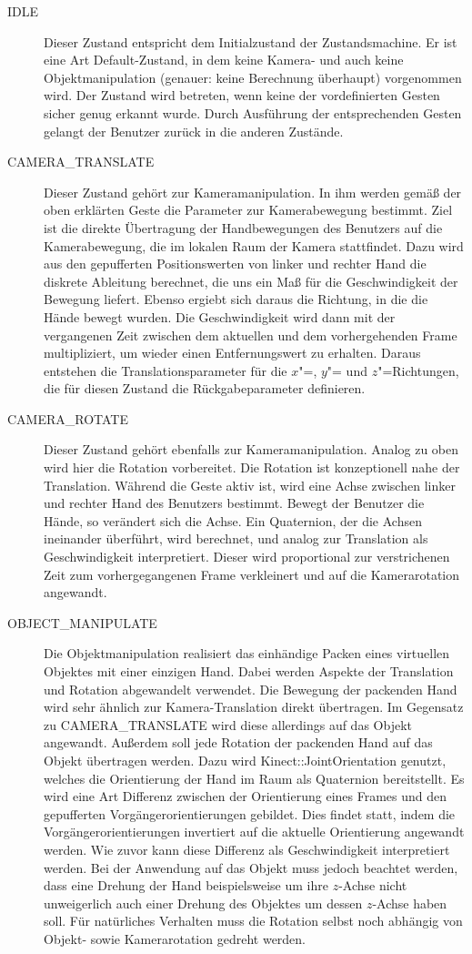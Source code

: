 	\begin{description}
		\item[IDLE] Dieser Zustand entspricht dem Initialzustand der Zustandsmachine. Er ist eine Art Default-Zustand, in dem keine Kamera- und auch keine Objektmanipulation (genauer: keine Berechnung überhaupt) vorgenommen wird. Der Zustand wird betreten, wenn keine der vordefinierten Gesten sicher genug erkannt wurde. Durch Ausführung der entsprechenden Gesten gelangt der Benutzer zurück in die anderen Zustände.
		\item[CAMERA\_TRANSLATE] Dieser Zustand gehört zur Kameramanipulation. In ihm werden gemäß der oben erklärten Geste die Parameter zur Kamerabewegung bestimmt. Ziel ist die direkte Übertragung der Handbewegungen des Benutzers auf die Kamerabewegung, die im lokalen Raum der Kamera stattfindet. Dazu wird aus den gepufferten Positionswerten von linker und rechter Hand die diskrete Ableitung berechnet, die uns ein Maß für die Geschwindigkeit der Bewegung liefert. Ebenso ergiebt sich daraus die Richtung, in die die Hände bewegt wurden. Die Geschwindigkeit wird dann mit der vergangenen Zeit zwischen dem aktuellen und dem vorhergehenden Frame multipliziert, um wieder einen Entfernungswert zu erhalten. Daraus entstehen die Translationsparameter für die $x$"=, $y$"= und $z$"=Richtungen, die für diesen Zustand die Rückgabeparameter definieren.
		\item[CAMERA\_ROTATE] Dieser Zustand gehört ebenfalls zur Kameramanipulation. Analog zu oben wird hier die Rotation vorbereitet. Die Rotation ist konzeptionell nahe der Translation. Während die Geste aktiv ist, wird eine Achse zwischen linker und rechter Hand des Benutzers bestimmt. Bewegt der Benutzer die Hände, so verändert sich die Achse. Ein Quaternion, der die Achsen ineinander überführt, wird berechnet, und analog zur Translation als Geschwindigkeit interpretiert. Dieser wird proportional zur verstrichenen Zeit zum vorhergegangenen Frame verkleinert und auf die Kamerarotation angewandt.
		\item[OBJECT\_MANIPULATE] Die Objektmanipulation realisiert das einhändige Packen eines virtuellen Objektes mit einer einzigen Hand. Dabei werden Aspekte der Translation und Rotation abgewandelt verwendet. Die Bewegung der packenden Hand wird sehr ähnlich zur Kamera-Translation direkt übertragen. Im Gegensatz zu CAMERA\_TRANSLATE wird diese allerdings auf das Objekt angewandt. Außerdem soll jede Rotation der packenden Hand auf das Objekt übertragen werden. Dazu wird Kinect::JointOrientation genutzt, welches die Orientierung der Hand im Raum als Quaternion bereitstellt. Es wird eine Art Differenz zwischen der Orientierung eines Frames und den gepufferten Vorgängerorientierungen gebildet. Dies findet statt, indem die Vorgängerorientierungen invertiert auf die aktuelle Orientierung angewandt werden. Wie zuvor kann diese Differenz als Geschwindigkeit interpretiert werden. Bei der Anwendung auf das Objekt muss jedoch beachtet werden, dass eine Drehung der Hand beispielsweise um ihre $z$-Achse nicht unweigerlich auch einer Drehung des Objektes um dessen $z$-Achse haben soll. Für natürliches Verhalten muss die Rotation selbst noch abhängig von Objekt- sowie Kamerarotation gedreht werden.

\end{description}

